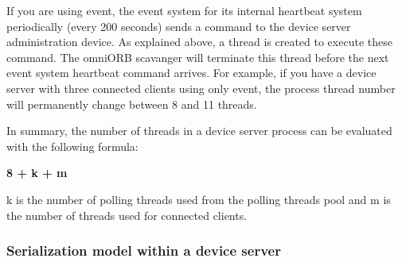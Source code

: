 If you are using event, the event system for its internal heartbeat
system periodically (every 200 seconds) sends a command to the device
server administration device. As explained above, a thread is created
to execute these command. The omniORB scavanger will terminate this
thread before the next event system heartbeat command arrives. For
example, if you have a device server with three connected clients
using only event, the process thread number will permanently change
between 8 and 11 threads.

In summary, the number of threads in a device server process can be
evaluated with the following formula:\begin{center}\textbf{8 + k
+ m}\end{center}k is the number of polling threads used from the
polling threads pool and m is the number of threads used for connected
clients.


\subsubsection{Serialization model within a device server}
\label{sub:Serialization-model-within}

